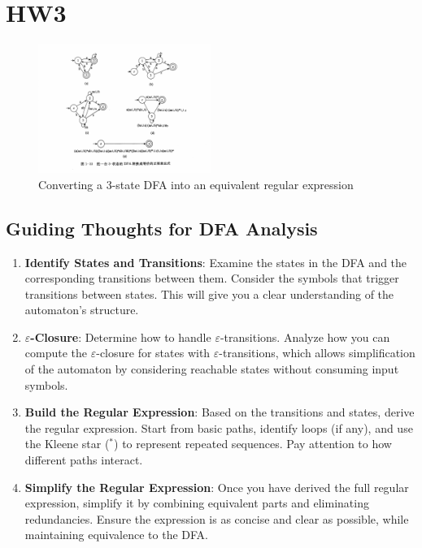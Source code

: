 \documentclass[lettersize,journal]{IEEEtran}
\begin{document}
\section{\textbf{HW3}}
\begin{figure}[h]  
    \centering
    \includegraphics[width=0.5\textwidth]{hw3.jpg} 
    \caption{Converting a 3-state DFA into an equivalent regular expression}
    \label{fig:hw3}
\end{figure}
\subsection*{Guiding Thoughts for DFA Analysis}

\begin{enumerate}[label=\arabic*.] 
    \item \textbf{Identify States and Transitions}: 
    Examine the states in the DFA and the corresponding transitions between them. Consider the symbols that trigger transitions between states. This will give you a clear understanding of the automaton's structure.
    
    \item \textbf{$\varepsilon$-Closure}: 
    Determine how to handle $\varepsilon$-transitions. Analyze how you can compute the $\varepsilon$-closure for states with $\varepsilon$-transitions, which allows simplification of the automaton by considering reachable states without consuming input symbols.
    
    \item \textbf{Build the Regular Expression}: 
    Based on the transitions and states, derive the regular expression. Start from basic paths, identify loops (if any), and use the Kleene star ($^*$) to represent repeated sequences. Pay attention to how different paths interact.
    
    \item \textbf{Simplify the Regular Expression}: 
    Once you have derived the full regular expression, simplify it by combining equivalent parts and eliminating redundancies. Ensure the expression is as concise and clear as possible, while maintaining equivalence to the DFA.
\end{enumerate}
\end{document}
